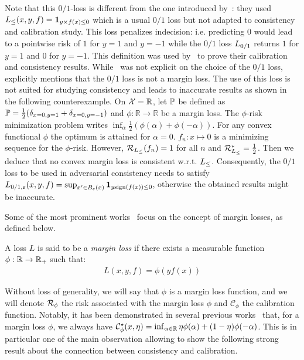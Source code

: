 Note that this $0/1$-loss is different from the one introduced by~\citet{bao2020calibrated,awasthi2021calibration,awasthi2021finer}: they used $L_{\leq}(x,y,f)=\mathbf{1}_{y\times f(x)\leq 0}$ which is a usual $0/1$ loss but not adapted to consistency and calibration study. This loss penalizes indecision: i.e. predicting $0$ would lead to a pointwise risk of $1$ for $y=1$ and $y=-1$ while the $0/1$ loss $L_{0/1}$ returns $1$ for $y=1$ and $0$ for $y=-1$. This definition was used by~\citet{bao2020calibrated,awasthi2021calibration,awasthi2021finer} to prove their calibration and consistency results. While~\citet{bartlett2006convexity} was not explicit on the choice of the $0/1$ loss,~\citet{steinwart2007compare} explicitly mentions that the $0/1$ loss is not a margin loss. The use of this loss is not suited for studying consistency and leads to inaccurate results as shown in the following counterexample. On $\mathcal{X}= \mathbb{R}$, let $\mathbb{P}$ be defined as 
$\PP = \frac12\left(\delta_{x=0,y=1}+\delta_{x=0,y=-1}\right)$ and $\phi:\mathbb{R}\to\mathbb{R}$ be a margin  loss. The $\phi$-risk minimization problem writes $\inf_{\alpha} \frac{1}{2} (\phi(\alpha)+\phi(-\alpha))$. For any convex functional $\phi$ the optimum is attained for $\alpha=0$. $f_n:x\mapsto 0$ is a minimizing sequence for the $\phi$-risk. However, $\mathcal{R}_{L_{\leq}}(f_n)=1$ for all $n$ and $\mathcal{R}_{L_{\leq}}^*=\frac{1}{2}$. Then we deduce that no convex margin loss is consistent w.r.t. $L_{\leq}$. Consequently, the $0/1$ loss to be used in adversarial consistency needs to satisfy $L_{0/1,\varepsilon}(x,y,f) = \sup_{x'\in B_\varepsilon(x)} \mathbf{1}_{y\text{sign}(f(x))\leq 0}$, otherwise the obtained results might be inaccurate.



Some of the most prominent works~\citep{zhang2004statistical,bartlett2006convexity,steinwart2007compare} focus on the concept of margin losses, as defined below. 

\begin{definition}
A loss $L$ is said to be a \emph{margin loss} if there exists a measurable function $\phi:\mathbb{R}\to\mathbb{R}_+$ such that: 
\begin{align*}
    L(x,y,f) = \phi(yf(x))
\end{align*}
\end{definition}
Without loss of generality, we will  say that $\phi$ is a margin loss function, and we will denote $\mathcal{R}_\phi$  the risk associated with the margin loss $\phi$ and $\mathcal{C}_\phi$ the calibration function. Notably, it has been demonstrated in several previous works~\citep{zhang2004statistical,bartlett2006convexity,steinwart2007compare} that, for a margin loss $\phi$, we always have
$ \mathcal{C}^\star_\phi(x,\eta) = \inf_{\alpha\in\mathbb{R}}\eta \phi(\alpha)+(1-\eta)\phi(-\alpha)$. This is in particular one of the main observation allowing to show the following strong result about the connection between consistency and calibration.

